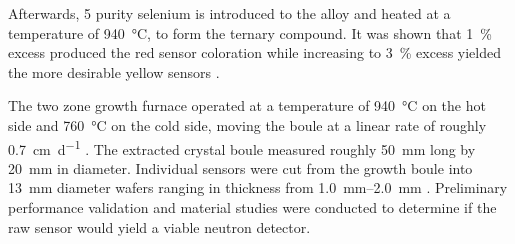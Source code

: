 \documentclass[../../../main.tex]{subfiles}
\begin{document}
    Afterwards, \SI{5}{\nines} purity selenium is introduced to the alloy and heated at a temperature of \SI{940}{\celsius}, to form the ternary compound.
    It was shown that \SI{1}{\percent} excess  produced the red sensor coloration while increasing to \SI{3}{\percent} excess  yielded the more desirable yellow sensors \cite{Tupitsyn_2014}.
    \par%
    The two zone growth furnace operated at a temperature of \SI{940}{\celsius} on the hot side and \SI{760}{\celsius} on the cold side, moving the boule at a linear rate of roughly \SI[per-mode=symbol]{0.7}{\centi\meter\per\day} \cite{Wiggins_2015}.
    The extracted crystal boule measured roughly \SI{50}{\milli\meter} long by \SI{20}{\milli\meter} in diameter.
    Individual sensors were cut from the growth boule into \SI{13}{\milli\meter} diameter wafers ranging in thickness from \SIrange{1.0}{2.0}{\milli\meter} \cite{Stowe_2013a}.
    Preliminary performance validation and material studies were conducted to determine if the raw sensor would yield a viable neutron detector.
\end{document}

